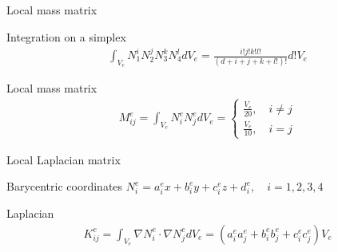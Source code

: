 \documentclass[handout]{beamer}
{
\usepackage{fullpage}
\usepackage{hyperref}
\usepackage{amssymb} 
}
\newcommand{\pmat}[1]{\begin{pmatrix}#1\end{pmatrix}}
\begin{document}
\begin{frame}{Local mass matrix}
\centering
\begin{minipage}{0.65\textwidth}

\begin{block}{Integration on a simplex}
\begin{align*}
\int_{V_e} N_1^i N_2^j N_3^k N_4^l d V_e = \frac{i! j! k! l!}{(d + i + j + k + l!)!} d! V_{e}
\end{align*}
\end{block}

\bigskip 

\begin{block}{Local mass matrix}
\begin{align*}
M_{ij}^e = \int_{V_e} N_i^e N_j^e d V_e = 
\begin{cases}
\frac{V_e}{20}, \quad i \ne j  \\
\frac{V_e}{10}, \quad i = j  
\end{cases}
\end{align*}
\end{block}
\end{minipage}
\end{frame}


\begin{frame}{Local Laplacian matrix}
\centering
\begin{minipage}{0.7\textwidth}

\begin{block}{Barycentric coordinates}
$N_i^e = a^e_i x + b^e_i y + c^e_i z + d^e_i, \quad i=1,2,3,4$
\end{block}

\begin{block}{Laplacian}
\begin{align*}
K_{ij}^e = \int_{V_e} \nabla N_i^e \cdot \nabla N_j^e d V_e = (a^e_i a^e_j + b^e_i b^e_j + c^e_i c^e_j) V_e
\end{align*}
\end{block}
\end{minipage}
\end{frame}
\end{document}
